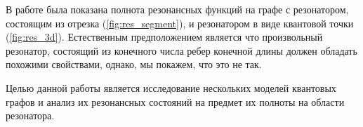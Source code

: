 В работе \cite{spectralpavlov16} была показана полнота резонансных функций на графе с резонатором, состоящим из отрезка (\autoref{fig:res_segment}), и резонатором в виде квантовой точки (\autoref{fig:res_3d}). Естественным предположением является что произвольный резонатор, состоящий из конечного числа ребер конечной длины должен обладать похожими свойствами, однако, мы покажем, что это не так.

Целью данной работы является исследование нескольких моделей квантовых графов и анализ их резонансных состояний на предмет их полноты на области резонатора.